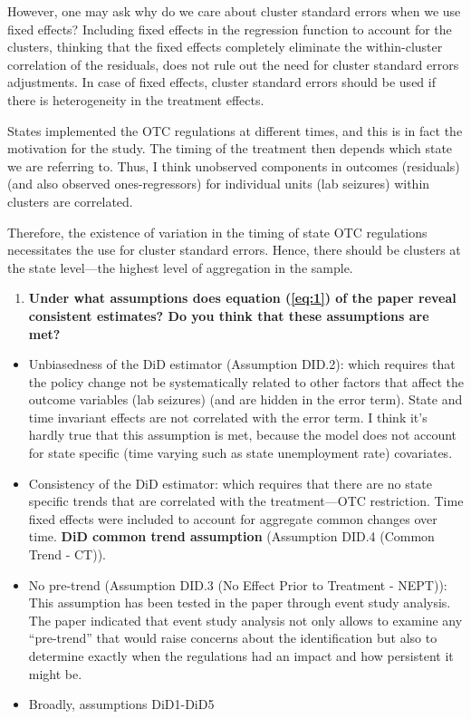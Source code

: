 \documentclass[
  11pt,
]{article}
\providecommand{\tightlist}{%
  \setlength{\itemsep}{0pt}\setlength{\parskip}{0pt}}
\begin{document}
However, one may ask why do we care about cluster standard errors when
we use fixed effects? Including fixed effects in the regression function
to account for the clusters, thinking that the fixed effects completely
eliminate the within-cluster correlation of the residuals, does not rule
out the need for cluster standard errors adjustments. In case of fixed
effects, cluster standard errors should be used if there is
heterogeneity in the treatment effects.

States implemented the OTC regulations at different times, and this is
in fact the motivation for the study. The timing of the treatment then
depends which state we are referring to. Thus, I think unobserved
components in outcomes (residuals) (and also observed ones-regressors)
for individual units (lab seizures) within clusters are correlated.

Therefore, the existence of variation in the timing of state OTC
regulations necessitates the use for cluster standard errors. Hence,
there should be clusters at the state level---the highest level of
aggregation in the sample.

\begin{enumerate}
\def\labelenumi{(\alph{enumi})}
\setcounter{enumi}{3}
\tightlist
\item
  \textbf{Under what assumptions does equation (\ref{eq:1}) of the paper
  reveal consistent estimates? Do you think that these assumptions are
  met?}
\end{enumerate}

\begin{itemize}
\item
  Unbiasedness of the DiD estimator (Assumption DID.2): which requires
  that the policy change not be systematically related to other factors
  that affect the outcome variables (lab seizures) (and are hidden in
  the error term). State and time invariant effects are not correlated
  with the error term. I think it's hardly true that this assumption is
  met, because the model does not account for state specific (time
  varying such as state unemployment rate) covariates.
\item
  Consistency of the DiD estimator: which requires that there are no
  state specific trends that are correlated with the treatment---OTC
  restriction. Time fixed effects were included to account for aggregate
  common changes over time. \textbf{DiD common trend assumption}
  (Assumption DID.4 (Common Trend - CT)).
\item
  No pre-trend (Assumption DID.3 (No Effect Prior to Treatment - NEPT)):
  This assumption has been tested in the paper through event study
  analysis. The paper indicated that event study analysis not only
  allows to examine any ``pre-trend'' that would raise concerns about
  the identification but also to determine exactly when the regulations
  had an impact and how persistent it might be.
\item
  Broadly, assumptions DiD1-DiD5
\end{itemize}
\end{document}
